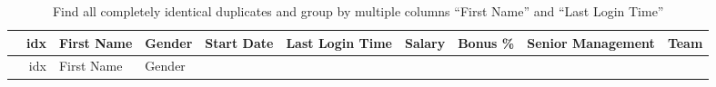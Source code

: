 \documentclass [oneside,10pt,a4paper,ngerman,BCOR10mm,headsepline,parindent,final]{scrartcl}
\begin{document}
    \begin{longtable}[]{@{}rrllllrrll@{}}
\caption{Find all completely identical duplicates and group by multiple
columns ``First Name'' and ``Last Login Time''}\tabularnewline
\toprule
\begin{minipage}[b]{0.03\columnwidth}\raggedleft
\strut
\end{minipage} & \begin{minipage}[b]{0.04\columnwidth}\raggedleft
idx\strut
\end{minipage} & \begin{minipage}[b]{0.08\columnwidth}\raggedright
First Name\strut
\end{minipage} & \begin{minipage}[b]{0.06\columnwidth}\raggedright
Gender\strut
\end{minipage} & \begin{minipage}[b]{0.08\columnwidth}\raggedright
Start Date\strut
\end{minipage} & \begin{minipage}[b]{0.10\columnwidth}\raggedright
Last Login Time\strut
\end{minipage} & \begin{minipage}[b]{0.06\columnwidth}\raggedleft
Salary\strut
\end{minipage} & \begin{minipage}[b]{0.06\columnwidth}\raggedleft
Bonus \%\strut
\end{minipage} & \begin{minipage}[b]{0.12\columnwidth}\raggedright
Senior Management\strut
\end{minipage} & \begin{minipage}[b]{0.12\columnwidth}\raggedright
Team\strut
\end{minipage}\tabularnewline
\midrule
\endfirsthead
\toprule
\begin{minipage}[b]{0.03\columnwidth}\raggedleft
\strut
\end{minipage} & \begin{minipage}[b]{0.04\columnwidth}\raggedleft
idx\strut
\end{minipage} & \begin{minipage}[b]{0.08\columnwidth}\raggedright
First Name\strut
\end{minipage} & \begin{minipage}[b]{0.06\columnwidth}\raggedright
Gender\strut
\end{minipage} & \begin{minipage}[b]{0.08\columnwidth}\raggedright

\end{minipage}
\end{longtable}
\end{document}
